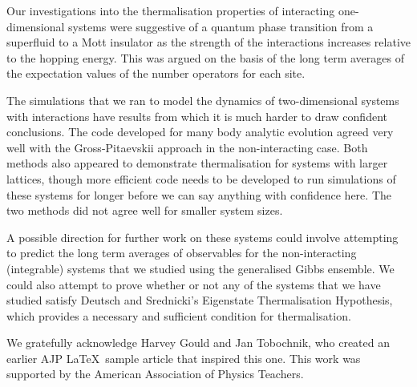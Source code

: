 \documentclass[prb, twocolumn, final]{revtex4-1}
\theoremstyle{plain}
\begin{document}
Our investigations into the thermalisation properties of interacting
one-dimensional systems were suggestive of a quantum phase transition from a
superfluid to a Mott insulator as the strength of the interactions increases
relative to the hopping energy. This was argued on the basis of the long term
averages of the expectation values of the number operators for each site.


The simulations that we ran to model the dynamics of two-dimensional systems
with interactions have results from which it is much harder to draw confident
conclusions. The code developed for many body analytic evolution agreed very
well with the Gross-Pitaevskii approach in the non-interacting case. Both methods
also appeared to demonstrate thermalisation for systems with larger lattices,
though more efficient code needs to be developed to run simulations of these
systems for longer before we can say anything with confidence here. The two
methods did not agree well for smaller system sizes.

A possible direction for further work on these systems could involve attempting
to predict the long term averages of observables for the non-interacting
(integrable) systems that we studied using the generalised Gibbs ensemble.
We could also attempt to prove whether or not any of the systems that we have
studied satisfy Deutsch and Srednicki's Eigenstate Thermalisation Hypothesis,
which provides a necessary and sufficient condition for thermalisation.



\begin{acknowledgments}
    We gratefully acknowledge Harvey Gould and Jan Tobochnik, who created an
    earlier AJP \LaTeX\ sample article that inspired this one.  This work was
    supported by the American Association of Physics Teachers.
\end{acknowledgments}




\end{document}
